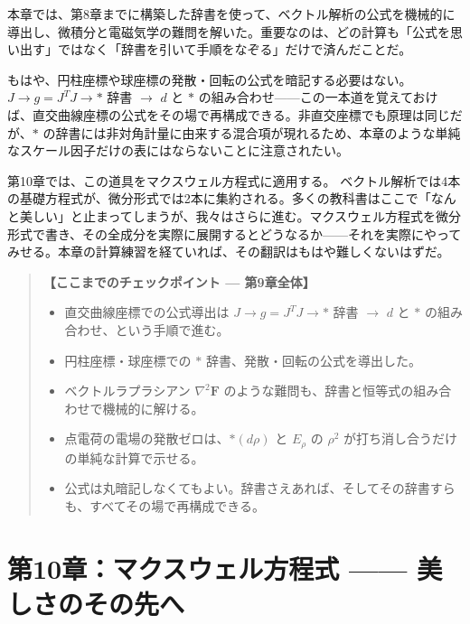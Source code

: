 \documentclass[a4paper,12pt,openany]{book}
\begin{document}
本章では、第8章までに構築した辞書を使って、ベクトル解析の公式を機械的に導出し、微積分と電磁気学の難問を解いた。重要なのは、どの計算も「公式を思い出す」ではなく「辞書を引いて手順をなぞる」だけで済んだことだ。

もはや、円柱座標や球座標の発散・回転の公式を暗記する必要はない。\(J \to g = J^T J \to \ast\)
辞書 \(\to\) \(d\) と \(\ast\)
の組み合わせ——この一本道を覚えておけば、直交曲線座標の公式をその場で再構成できる。非直交座標でも原理は同じだが、\(\ast\)
の辞書には非対角計量に由来する混合項が現れるため、本章のような単純なスケール因子だけの表にはならないことに注意されたい。

第10章では、この道具をマクスウェル方程式に適用する。
ベクトル解析では4本の基礎方程式が、微分形式では2本に集約される。多くの教科書はここで「なんと美しい」と止まってしまうが、我々はさらに進む。マクスウェル方程式を微分形式で書き、その全成分を実際に展開するとどうなるか——それを実際にやってみせる。本章の計算練習を経ていれば、その翻訳はもはや難しくないはずだ。

\begin{quote}
\textbf{【ここまでのチェックポイント — 第9章全体】}

\begin{itemize}
\item
  直交曲線座標での公式導出は \(J \to g = J^T J \to \ast\) 辞書 \(\to\)
  \(d\) と \(\ast\) の組み合わせ、という手順で進む。
\item
  円柱座標・球座標での \(\ast\) 辞書、発散・回転の公式を導出した。
\item
  ベクトルラプラシアン \(\nabla^2\mathbf{F}\)
  のような難問も、辞書と恒等式の組み合わせで機械的に解ける。
\item
  点電荷の電場の発散ゼロは、\(\ast(d\rho)\) と \(E_\rho\) の \(\rho^2\)
  が打ち消し合うだけの単純な計算で示せる。
\item
  公式は丸暗記しなくてもよい。辞書さえあれば、そしてその辞書すらも、すべてその場で再構成できる。
\end{itemize}
\end{quote}

\newpage

\hypertarget{ux7b2c10ux7ae0ux30deux30afux30b9ux30a6ux30a7ux30ebux65b9ux7a0bux5f0f-ux7f8eux3057ux3055ux306eux305dux306eux5148ux3078}{%
\chapter{第10章：マクスウェル方程式 ——
美しさのその先へ}\label{ux7b2c10ux7ae0ux30deux30afux30b9ux30a6ux30a7ux30ebux65b9ux7a0bux5f0f-ux7f8eux3057ux3055ux306eux305dux306eux5148ux3078}}
\end{document}
